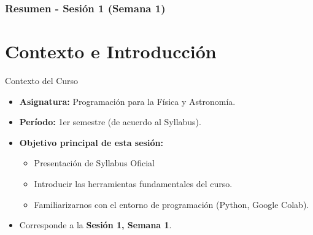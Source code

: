 \documentclass[10pt]{beamer}
\begin{document}
\myfront{}

\begin{frame}
  \titlepage
\end{frame}

\begin{frame}
  \frametitle{Resumen - Sesión 1 (Semana 1)}
  \tableofcontents
\end{frame}


\section{Contexto e Introducción}

\begin{frame}{Contexto del Curso}
  \begin{itemize}
    \item \textbf{Asignatura:} Programación para la Física y Astronomía.
    \item \textbf{Período:} 1er semestre (de acuerdo al Syllabus).
    \item \textbf{Objetivo principal de esta sesión:}
      \begin{itemize}
        \item Presentación de Syllabus Oficial
        \item Introducir las herramientas fundamentales del curso.
        \item Familiarizarnos con el entorno de programación (Python, Google Colab).
      \end{itemize}
    \item Corresponde a la \textbf{Sesión 1, Semana 1}.
  \end{itemize}
\end{frame}
\end{document}
